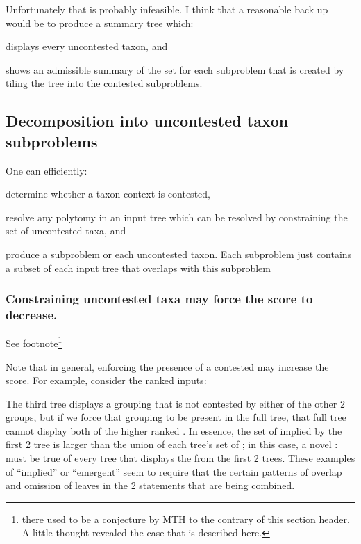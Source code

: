 \documentclass[11pt]{article}
\begin{document}
Unfortunately that is probably infeasible.  I think that a reasonable back up would be to 
    produce a summary tree which:
\begin{compactenum}
    \item displays every uncontested taxon, and
    \item shows an admissible summary of the \MSWIPSD set for each subproblem that is
       created by tiling the tree into the contested subproblems.
\end{compactenum}
\subsection{Decomposition into uncontested taxon subproblems}
One can efficiently:
\begin{compactenum}
    \item determine whether a taxon context is contested,
    \item resolve any polytomy in an input tree which can be resolved by constraining
        the set of uncontested taxa, and
    \item produce a subproblem or each uncontested taxon. Each subproblem just contains
        a subset of each input tree that overlaps with this subproblem
\end{compactenum}

\subsubsection{Constraining uncontested taxa may force the \SWIPSD score to decrease.}
See footnote\footnote{there used to be a conjecture by MTH to the contrary of this section header.
A little thought revealed the case that is described here.}

Note that in general, enforcing the presence of a contested \pss may increase the 
    \SWIPSD score.
For example, consider the ranked inputs:
\begin{compactenum}
\item {}
\item {}
\item {}
\end{compactenum}
The third tree displays a grouping that is not contested by either of the other 2 groups, but
    if we force that grouping to be present in the full tree, that full tree cannot 
    display both of the higher ranked \pss.
In essence, the set of \pss implied by the first 2 tree is larger than the union of each tree's set
    of \pss; in this case, a novel \pss:  must be true of every 
    tree that displays the \pss from the first 2 trees.
These examples of ``implied'' or ``emergent'' \pss seem to require that the certain
    patterns of overlap and omission of leaves in the 2 statements that are being combined.
\end{document}
